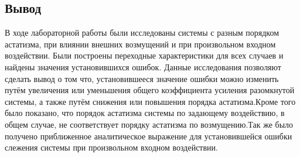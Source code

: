 \documentclass[a4paper,12pt]{article} %
\begin{document}
\newpage
\begin{center}
\section{Вывод}
\end{center}
\par
В ходе лабораторной работы были исследованы системы с разным порядком астатизма, при влиянии внешних возмущений и при произвольном входном воздействии. Были построены переходные характеристики для всех случаев и найдены значения установившихся ошибок. Данные исследования позволяют сделать вывод о том что, установившееся значение ошибки можно изменить путём увеличения или уменьшения общего коэффициента усиления разомкнутой системы, а также путём снижения или повышения порядка астатизма.Кроме того было показано, что порядок астатизма системы по задающему воздействию, в общем случае, не соответствует порядку астатизма по возмущению.Так же было получено приближенное аналитическое выражение для установившейся ошибки слежения системы при произвольном входном воздействии.
\end{document}
